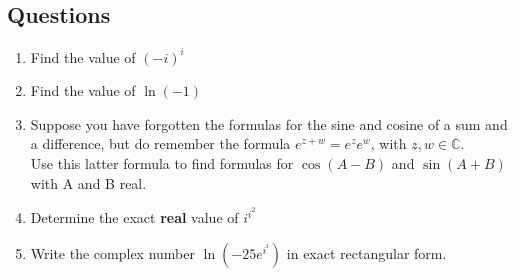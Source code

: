 \documentclass[../main.tex]{subfiles}
\begin{document}
\pagebreak

\subsection*{Questions}
\label{eulersformula}
\begin{enumerate}
    \item 
    Find the value of \((-i)^i\)\\

    \item 
    Find the value of \(\ln{(-1)}\)\\

    \item 
    Suppose you have forgotten the formulas for the sine and cosine of a sum and a difference, but do remember the formula \(e^{z+w}=e^z e^w\), with \(z, w \in \mathbb{C} \).\\
    Use this latter formula to find formulas for \(\cos{(A-B)}\) and \(\sin{(A+B)}\) with A and B real.\\

    \item 
    Determine the exact \textbf{real} value of \(i^{i^{2}}\)\\

    \item 
    Write the complex number \(\ln{(-25e^{i^{i}})}\) in exact rectangular form.\\

    
\end{enumerate}
\end{document}
